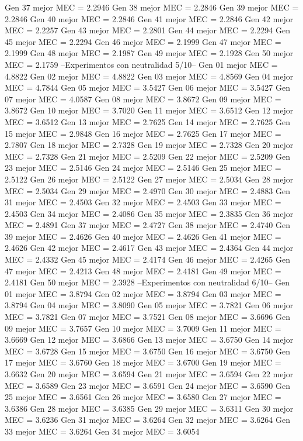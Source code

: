 Gen 37 mejor MEC = 2.2946
Gen 38 mejor MEC = 2.2846
Gen 39 mejor MEC = 2.2846
Gen 40 mejor MEC = 2.2846
Gen 41 mejor MEC = 2.2846
Gen 42 mejor MEC = 2.2257
Gen 43 mejor MEC = 2.2801
Gen 44 mejor MEC = 2.2294
Gen 45 mejor MEC = 2.2294
Gen 46 mejor MEC = 2.1999
Gen 47 mejor MEC = 2.1999
Gen 48 mejor MEC = 2.1987
Gen 49 mejor MEC = 2.1928
Gen 50 mejor MEC = 2.1759
--Experimentos con neutralidad 5/10--
Gen 01 mejor MEC = 4.8822
Gen 02 mejor MEC = 4.8822
Gen 03 mejor MEC = 4.8569
Gen 04 mejor MEC = 4.7844
Gen 05 mejor MEC = 3.5427
Gen 06 mejor MEC = 3.5427
Gen 07 mejor MEC = 4.0587
Gen 08 mejor MEC = 3.8672
Gen 09 mejor MEC = 3.8672
Gen 10 mejor MEC = 3.7020
Gen 11 mejor MEC = 3.6512
Gen 12 mejor MEC = 3.6512
Gen 13 mejor MEC = 2.7625
Gen 14 mejor MEC = 2.7625
Gen 15 mejor MEC = 2.9848
Gen 16 mejor MEC = 2.7625
Gen 17 mejor MEC = 2.7807
Gen 18 mejor MEC = 2.7328
Gen 19 mejor MEC = 2.7328
Gen 20 mejor MEC = 2.7328
Gen 21 mejor MEC = 2.5209
Gen 22 mejor MEC = 2.5209
Gen 23 mejor MEC = 2.5146
Gen 24 mejor MEC = 2.5146
Gen 25 mejor MEC = 2.5122
Gen 26 mejor MEC = 2.5122
Gen 27 mejor MEC = 2.5034
Gen 28 mejor MEC = 2.5034
Gen 29 mejor MEC = 2.4970
Gen 30 mejor MEC = 2.4883
Gen 31 mejor MEC = 2.4503
Gen 32 mejor MEC = 2.4503
Gen 33 mejor MEC = 2.4503
Gen 34 mejor MEC = 2.4086
Gen 35 mejor MEC = 2.3835
Gen 36 mejor MEC = 2.4891
Gen 37 mejor MEC = 2.4727
Gen 38 mejor MEC = 2.4740
Gen 39 mejor MEC = 2.4626
Gen 40 mejor MEC = 2.4626
Gen 41 mejor MEC = 2.4626
Gen 42 mejor MEC = 2.4617
Gen 43 mejor MEC = 2.4364
Gen 44 mejor MEC = 2.4332
Gen 45 mejor MEC = 2.4174
Gen 46 mejor MEC = 2.4265
Gen 47 mejor MEC = 2.4213
Gen 48 mejor MEC = 2.4181
Gen 49 mejor MEC = 2.4181
Gen 50 mejor MEC = 2.3928
--Experimentos con neutralidad 6/10--
Gen 01 mejor MEC = 3.8794
Gen 02 mejor MEC = 3.8794
Gen 03 mejor MEC = 3.8794
Gen 04 mejor MEC = 3.8090
Gen 05 mejor MEC = 3.7821
Gen 06 mejor MEC = 3.7821
Gen 07 mejor MEC = 3.7521
Gen 08 mejor MEC = 3.6696
Gen 09 mejor MEC = 3.7657
Gen 10 mejor MEC = 3.7009
Gen 11 mejor MEC = 3.6669
Gen 12 mejor MEC = 3.6866
Gen 13 mejor MEC = 3.6750
Gen 14 mejor MEC = 3.6728
Gen 15 mejor MEC = 3.6750
Gen 16 mejor MEC = 3.6750
Gen 17 mejor MEC = 3.6760
Gen 18 mejor MEC = 3.6700
Gen 19 mejor MEC = 3.6632
Gen 20 mejor MEC = 3.6594
Gen 21 mejor MEC = 3.6594
Gen 22 mejor MEC = 3.6589
Gen 23 mejor MEC = 3.6591
Gen 24 mejor MEC = 3.6590
Gen 25 mejor MEC = 3.6561
Gen 26 mejor MEC = 3.6580
Gen 27 mejor MEC = 3.6386
Gen 28 mejor MEC = 3.6385
Gen 29 mejor MEC = 3.6311
Gen 30 mejor MEC = 3.6236
Gen 31 mejor MEC = 3.6264
Gen 32 mejor MEC = 3.6264
Gen 33 mejor MEC = 3.6264
Gen 34 mejor MEC = 3.6054
